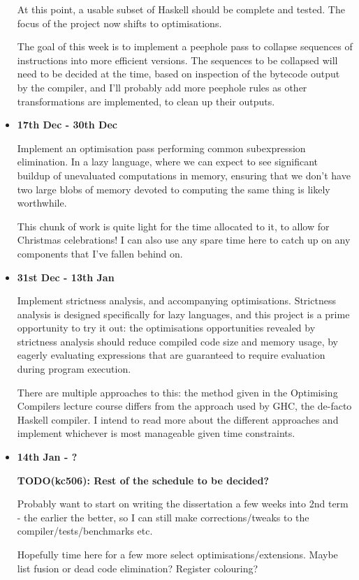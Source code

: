\documentclass[12pt]{article}
\newcommand\todo[1]{\textbf{TODO(kc506): #1}}
\begin{document}
\begin{itemize}
{    At this point, a usable subset of Haskell should be complete and tested. The focus of the project now shifts to
    optimisations.

    The goal of this week is to implement a peephole pass to collapse sequences of instructions into more efficient
    versions. The sequences to be collapsed will need to be decided at the time, based on inspection of the bytecode
    output by the compiler, and I'll probably add more peephole rules as other transformations are implemented, to clean
    up their outputs.
}
\item
{
    \textbf{17th Dec - 30th Dec}

    Implement an optimisation pass performing common subexpression elimination. In a lazy language, where we can expect
    to see significant buildup of unevaluated computations in memory, ensuring that we don't have two large blobs of
    memory devoted to computing the same thing is likely worthwhile.

    This chunk of work is quite light for the time allocated to it, to allow for Christmas celebrations! I can also use
    any spare time here to catch up on any components that I've fallen behind on.
}
\item
{
    \textbf{31st Dec - 13th Jan}

    Implement strictness analysis, and accompanying optimisations. Strictness analysis is designed specifically for lazy
    languages, and this project is a prime opportunity to try it out: the optimisations opportunities revealed by
    strictness analysis should reduce compiled code size and memory usage, by eagerly evaluating expressions that are guaranteed to require evaluation during program execution.

    There are multiple approaches to this: the method given in the Optimising Compilers lecture course differs from the
    approach used by GHC, the de-facto Haskell compiler. I intend to read more about the different approaches and
    implement whichever is most manageable given time constraints.
}
\item
{
    \textbf{14th Jan - ?}

    \todo{Rest of the schedule to be decided?}

    Probably want to start on writing the dissertation a few weeks into 2nd term - the earlier the better, so I can
    still make corrections/tweaks to the compiler/tests/benchmarks etc.

    Hopefully time here for a few more select optimisations/extensions. Maybe list fusion or dead code elimination?
    Register colouring?
}
\end{itemize}
\end{document}
